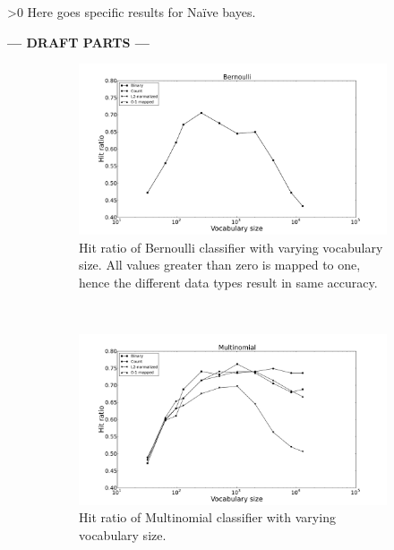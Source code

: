 \ifnum\printdraft>0
	Here goes specific results for Naïve bayes.
\else
\begin{center}
  	\textbf{--- DRAFT PARTS ---}
\end{center}
\fi
\newcommand{\figwidth}{0.49\textwidth}
\begin{figure}[H]
	\centering
	\begin{subfigure}[b]{\figwidth}
		\includegraphics[width=\textwidth]{img/Bernoulli-hitrate-eps-converted-to.pdf}
		\caption{Hit ratio of Bernoulli classifier with varying vocabulary size. All values greater than zero is mapped to one, hence the different data types result in same accuracy.}
		\label{fig:hitratio-nb}
	\end{subfigure}
	~
	\begin{subfigure}[b]{\figwidth}
		\includegraphics[width=\textwidth]{img/Multinomial-hitrate-eps-converted-to.pdf}
		\caption{Hit ratio of Multinomial classifier with varying vocabulary size.}
		\label{fig:hitratio-mn}
	\end{subfigure}
	\\
	\begin{subfigure}[b]{\figwidth}

\end{subfigure}
\end{figure}
